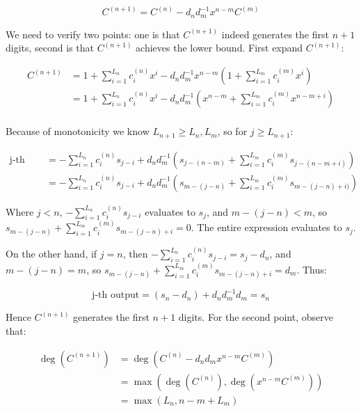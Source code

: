 \documentclass[runningheads]{llncs}
\begin{document}
\begin{equation*}
    C^{(n+1)} = C^{(n)} - d_nd_m^{-1}x^{n-m}C^{(m)}
\end{equation*}

We need to verify two points: one is that $C^{(n+1)}$ indeed generates the first $n+1$ digits, second is that $C^{(n+1)}$ achieves the lower bound. First expand $C^{(n+1)}$:

\begin{equation*}\begin{aligned}
    C^{(n+1)} &= 1 + \sum_{i=1}^{L_n}c^{(n)}_ix^i - d_nd_m^{-1}x^{n-m}\left(1 + \sum_{i=1}^{L_m}c_i^{(m)}x^i\right) \\
    &= 1 + \sum_{i=1}^{L_n}c^{(n)}_ix^i - d_nd_m^{-1}\left(x^{n-m} + \sum_{i=1}^{L_m}c_i^{(m)}x^{n - m + i}\right) \\
\end{aligned}\end{equation*}

Because of monotonicity we know $L_{n+1} \geq L_n, L_m$, so for $j \geq L_{n+1}$:

\begin{equation*}\begin{aligned}
   \text{j-th output} &= -\sum_{i=1}^{L_n}c_i^{(n)}s_{j-i} + d_nd_m^{-1}\left(
        s_{j - (n - m)} + \sum_{i=1}^{L_m}c_i^{(m)}s_{j - (n - m + i)}
    \right) \\
    &= -\sum_{i=1}^{L_n}c_i^{(n)}s_{j-i} + d_nd_m^{-1}\left(
        s_{m - (j - n)} + \sum_{i=1}^{L_m}c_i^{(m)}s_{m - (j - n) + i)}
    \right)
\end{aligned}\end{equation*}

Where $j < n$, $-\sum_{i=1}^{L_n}c_i^{(n)}s_{j-i}$ evaluates to $s_j$, and $m-(j-n) < m$, so $s_{m - (j - n)} + \sum_{i=1}^{L_m}c_i^{(m)}s_{m - (j - n) + i} = 0$. The entire expression evaluates to $s_j$.

On the other hand, if $j = n$, then $-\sum_{i=1}^{L_n}c_i^{(n)}s_{j-i} = s_j - d_n$, and $m-(j-n) = m$, so $s_{m - (j - n)} + \sum_{i=1}^{L_m}c_i^{(m)}s_{m - (j - n) + i} = d_m$. Thus:

$$
\text{j-th output} = (s_n - d_n) + d_nd_m^{-1}d_m = s_n
$$

Hence $C^{(n+1)}$ generates the first $n+1$ digits. For the second point, observe that:

\begin{equation*}\begin{aligned}
    \deg(C^{(n+1)}) &= \deg(C^{(n)} - d_nd_mx^{n-m}C^{(m)}) \\
    &= \max(\deg(C^{(n)}), \deg(x^{n-m}C^{(m)})) \\
    &= \max(L_n, n - m + L_m)
\end{aligned}\end{equation*}
\end{document}
